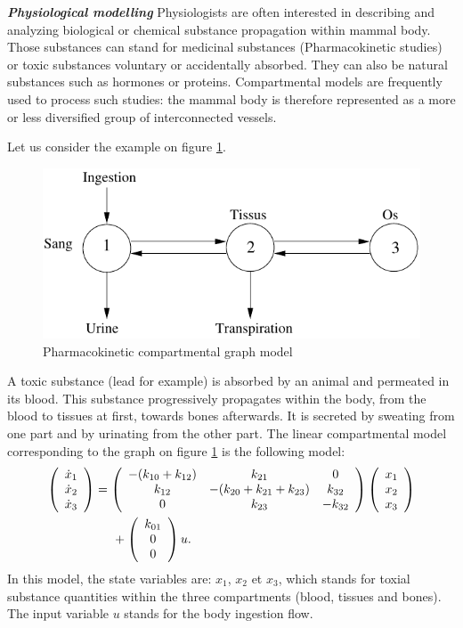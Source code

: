 \begin{exemple}{\bf \em Physiological modelling}
Physiologists are often interested in describing and analyzing biological or chemical substance propagation within mammal body.
Those substances can stand for medicinal substances (Pharmacokinetic studies) or toxic substances voluntary or accidentally absorbed.
They can also be natural substances such as hormones or proteins.
Compartmental models are frequently used to process such studies: 
the mammal body is therefore represented as a more or less diversified group of interconnected vessels.

Let us consider the example on figure \ref{Fig:grapharmaco}.
\begin{figure}[ht] 
\begin{center}
\includegraphics{grapharmaco}
\caption{Pharmacokinetic compartmental graph model}
\label{Fig:grapharmaco}
\end{center} 
\end{figure}

A toxic substance (lead for example) is absorbed by an animal and permeated in its blood.
This substance progressively propagates within the body, from the blood to tissues at first, towards bones afterwards.
It is secreted by sweating from one part and by urinating from the other part.
The linear compartmental model corresponding to the graph on figure \ref{Fig:grapharmaco} is the following model:
\begin{equation*} \begin{split}
\bma{c} \dot x_1 \\ \dot x_2 \\ \dot x_3 \ema &= 
\bma{ccc} -(k_{10} + k_{12}) & k_{21} & 0 \\ 
k_{12} & -(k_{20} + k_{21} + k_{23}) & k_{32} \\ 0 & k_{23} & - k_{32} \ema
\bma{c} x_1 \\ x_2 \\ x_3 \ema \\
& \hd + \bma{c} k_{ 01}\\ 0 \\ 0 \ema u.
\end{split} \end{equation*}
In this model, the state variables are: $x_1$, $x_2$ et $x_3$, which stands for toxial substance quantities within the three compartments (blood, tissues and bones).
The input variable $u$ stands for the body ingestion flow.
\cqfd
\end{exemple}


